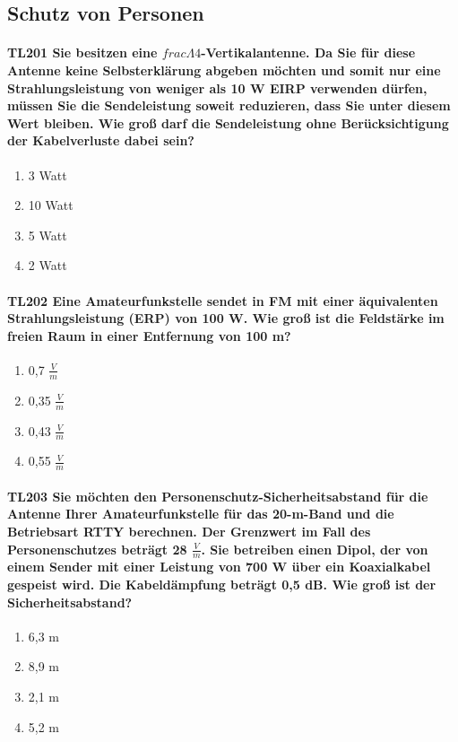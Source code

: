 \documentclass[8pt]{article}
\begin{document}
\pagebreak
\subsection{Schutz von Personen}
\paragraph*{TL201 Sie besitzen eine $frac{\Lambda}{4}$-Vertikalantenne. Da Sie für diese Antenne keine Selbsterklärung abgeben möchten und somit nur eine Strahlungsleistung von weniger als 10 W EIRP verwenden dürfen, müssen Sie die Sendeleistung soweit reduzieren, dass Sie unter diesem Wert bleiben. Wie groß darf die Sendeleistung ohne Berücksichtigung der Kabelverluste dabei sein?}
\begin{enumerate}[nolistsep,label=\Alph*]
\item 3 Watt
\item 10 Watt
\item 5 Watt
\item 2 Watt
\end{enumerate}

\paragraph*{TL202 Eine Amateurfunkstelle sendet in FM mit einer äquivalenten Strahlungsleistung (ERP)  von 100 W. Wie groß ist die Feldstärke im freien Raum in einer Entfernung von 100 m?} 
\begin{enumerate}[nolistsep,label=\Alph*]
\item 0,7 $\frac{V}{m}$
\item 0,35 $\frac{V}{m}$
\item 0,43 $\frac{V}{m}$
\item 0,55 $\frac{V}{m}$
\end{enumerate}

\paragraph*{TL203 Sie möchten den Personenschutz-Sicherheitsabstand für die Antenne Ihrer Amateurfunkstelle für das 20-m-Band und die Betriebsart RTTY berechnen. Der Grenzwert im Fall des Personenschutzes beträgt 28 $\frac{V}{m}$. Sie betreiben einen Dipol, der von einem Sender mit einer Leistung von 700 W über ein Koaxialkabel gespeist wird. Die Kabeldämpfung beträgt 0,5 dB. Wie groß ist der Sicherheitsabstand?}
\begin{enumerate}[nolistsep,label=\Alph*]
\item 6,3 m
\item 8,9 m
\item 2,1 m
\item 5,2 m
\end{enumerate}
\end{document}
